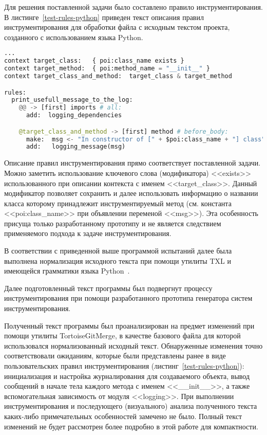 Для решения поставленной задачи было составлено правило инструментирования.
В листинге~\ref{test-rules-python} приведен текст описания правил инструментирования для обработки файла с исходным текстом проекта, созданного с использованием языка Python.

\begin{lstlisting}[frame=single, language=Python, label={test-rules-python}, caption={Описание правил инструментирования. Python-проект.}]
...
context target_class:   { poi:class_name exists }
context target_method:  { poi:method_name = "__init__" }
context target_class_and_method:  target_class & target_method

rules:
  print_usefull_message_to_the_log:
    @@ -> [first] imports # all:
      add:  logging_dependencies

    @target_class_and_method -> [first] method # before_body:
      make:  msg <- "In constructor of [" + $poi:class_name + "] class";
      add:   logging_message(msg)
\end{lstlisting}

Описание правил инструментирования прямо соответствует поставленной задачи.
Можно заметить использование ключевого слова (модификатора) <<exists>> использованного при описании контекста с именем <<target\_class>>.
Данный модификатор позволяет сохранить и далее использовать информацию о названии класса которому принадлежит инструментируемый метод (см. константа <<poi:class\_name>> при объявлении переменой <<msg>>).
Эта особенность присуща только разработанному прототипу и не является следствием применяемого подхода к задаче инструментирования.

В соответствии с приведенной выше программой испытаний далее была выполнена нормализация исходного текста при помощи утилиты TXL и имеющейся грамматики языка Python~\cite{txl-resources}.

Далее подготовленный текст программы был подвергнут процессу инструментирования при помощи разработанного прототипа генератора систем инструментирования.

Полученный текст программы был проанализирован на предмет изменений при помощи утилиты TortoiseGitMerge, в качестве базового файла для которой использовался нормализованный исходный текст.
Обнаруженные изменения точно соответствовали ожиданиям, которые были представлены ранее в виде пользовательских правил инструментирования (листинг~\ref{test-rules-python}):
инициализация и настройка журналирования для создаваемого объекта,
вывод сообщений в начале тела каждого метода с именем <<\_\_init\_\_>>,
а также вспомогательная зависимость от модуля <<logging>>.
При выполнении инструментирования и последующего (визуального) анализа полученного текста каких-либо примечательных особенностей замечено не было.
Полный текст изменений не будет рассмотрен более подробно в этой работе для компактности.

